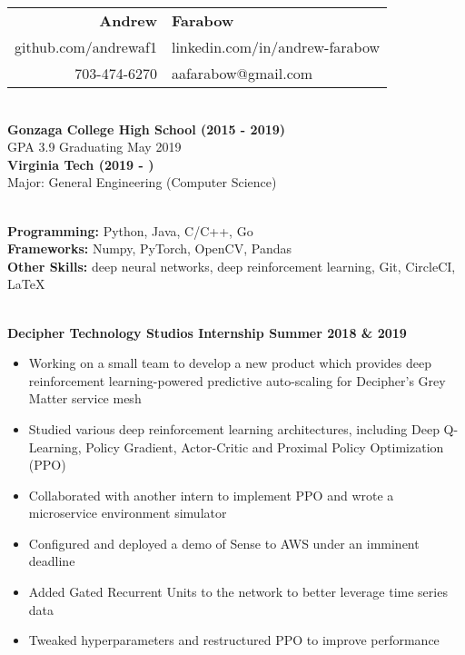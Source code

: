 \documentclass{article}
\begin{document}
  \begin{center}
    \begin{tabular}{r l}
      {\huge\textbf{Andrew}} & {\huge\textbf{Farabow}} \\
      github.com/andrewaf1 & linkedin.com/in/andrew-farabow \\
      703-474-6270 & aafarabow@gmail.com \\
    \end{tabular}


  \begin{flushleft}
    \begin{multicols}{2}
      {\large\textbf{\underline{}}} \\
      \textbf{Gonzaga College High School	(2015 - 2019)} \\
      GPA 3.9  Graduating May 2019 \\
      \textbf{Virginia Tech	(2019 - )} \\
      Major: General Engineering (Computer Science)

    \columnbreak
    {\large\textbf{\underline{}}} \\
    {\textbf{Programming:}} Python, Java, C/C++, Go \\
    {\textbf{Frameworks:}} Numpy, PyTorch, OpenCV, Pandas \\
    {\textbf{Other Skills:}} deep neural networks, deep reinforcement learning, Git, CircleCI, LaTeX \\

    \end{multicols}

    {\large\textbf{\underline{}}} \\
    \textbf{Decipher Technology Studios Internship \hfill Summer 2018 \& 2019}
    \begin{itemize}
      \item Working on a small team to develop a new product which provides deep reinforcement learning-powered predictive auto-scaling for Decipher's Grey Matter service mesh
      \item Studied various deep reinforcement learning architectures, including Deep Q-Learning, Policy Gradient, Actor-Critic and Proximal Policy Optimization (PPO)
      \item Collaborated with another intern to implement PPO and wrote a microservice environment simulator
      \item Configured and deployed a demo of Sense to AWS under an imminent deadline
      \item Added Gated Recurrent Units to the network to better leverage time series data
      \item Tweaked hyperparameters and restructured PPO to improve performance
    \end{itemize}



\end{flushleft}
\end{center}
\end{document}
